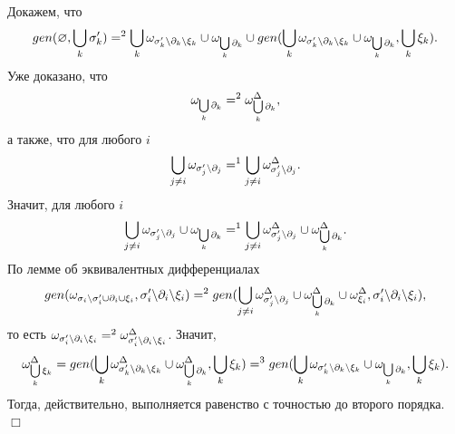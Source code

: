Докажем, что $$gen(\varnothing, \bigcup\limits_k {\sigma^\prime_k}) =^2 \bigcup\limits_k \omega_{{\sigma^\prime_k}{\setminus}{\partial_k}{\setminus}{\xi_k}} \cup \omega_{\bigcup\limits_k \partial_k} \cup gen(\bigcup\limits_k \omega_{{\sigma^\prime_k}{\setminus}{\partial_k}{\setminus}{\xi_k}} \cup \omega_{\bigcup\limits_k \partial_k}, \bigcup\limits_k {\xi_k}).$$ 
Уже доказано, что $$\omega_{\bigcup\limits_k {\partial_k}} =^2 \omega^\Delta_{\bigcup\limits_k {\partial_k}},$$ 
а также, что для любого $i$ $$\bigcup\limits_{j \neq i} \omega_{{\sigma^\prime_j}{\setminus}{\partial_j}} =^1 \bigcup\limits_{j \neq i} \omega^\Delta_{{\sigma^\prime_j}{\setminus}{\partial_j}}.$$ 
Значит, для любого $i$ $$\bigcup\limits_{j \neq i} \omega_{{\sigma^\prime_j}{\setminus}{\partial_j}} \cup \omega_{\bigcup\limits_k {\partial_k}} =^1 \bigcup\limits_{j \neq i} \omega^\Delta_{{\sigma^\prime_j}{\setminus}{\partial_j}} \cup \omega^\Delta_{\bigcup\limits_k {\partial_k}}.$$ 
По лемме об эквивалентных дифференциалах $$gen(\omega_{{\sigma_i}{\setminus}{\sigma^\prime_i} \cup {\partial_i} \cup {\xi_i}}, {\sigma^\prime_i}{\setminus}{\partial_i}{\setminus}{\xi_i}) =^2 gen(\bigcup\limits_{j \neq i} \omega^\Delta_{{\sigma^\prime_j}{\setminus}{\partial_j}} \cup \omega^\Delta_{\bigcup\limits_k {\partial_k}} \cup \omega^\Delta_{\xi_i}, {\sigma^\prime_i}{\setminus}{\partial_i}{\setminus}{\xi_i}),$$ 
то есть $\omega_{{\sigma^\prime_i}{\setminus}{\partial_i}{\setminus}{\xi_i}} =^2 \omega^\Delta_{{\sigma^\prime_i}{\setminus}{\partial_i}{\setminus}{\xi_i}}$. Значит, $$\omega^\Delta_{\bigcup\limits_k {\xi_k}} = gen(\bigcup\limits_k \omega^\Delta_{{\sigma^\prime_k}{\setminus}{\partial_k}{\setminus}{\xi_k}} \cup \omega^\Delta_{\bigcup\limits_k {\partial_k}}, \bigcup\limits_k {\xi_k}) =^3 gen(\bigcup\limits_k \omega_{{\sigma^\prime_k}{\setminus}{\partial_k}{\setminus}{\xi_k}} \cup \omega_{\bigcup\limits_k {\partial_k}}, \bigcup\limits_k {\xi_k}).$$ 
Тогда, действительно, выполняется равенство с точностью до второго порядка. $\Box$\\